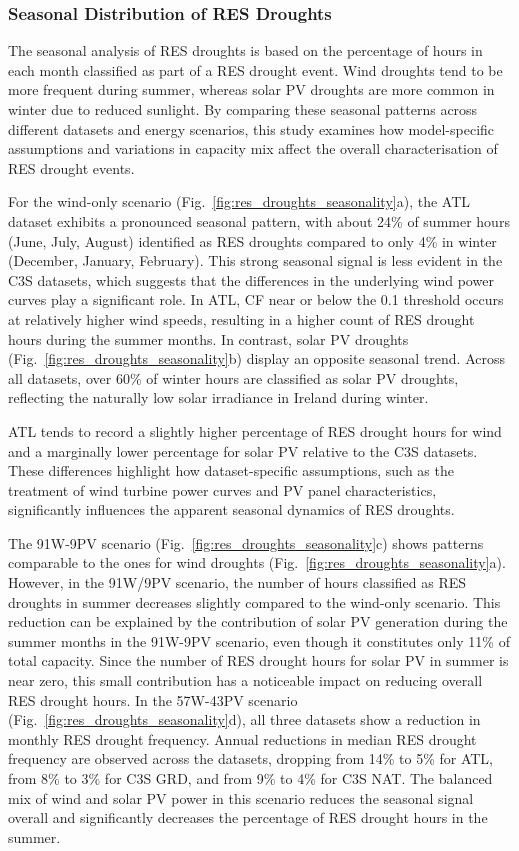 \documentclass[preprint, 12pt]{elsarticle}
\begin{document}
\subsubsection{Seasonal Distribution of RES Droughts}

The seasonal analysis of RES droughts is based on the percentage of hours in each month classified as part of a RES drought event. Wind droughts tend to be more frequent during summer, whereas solar PV droughts are more common in winter due to reduced sunlight. By comparing these seasonal patterns across different datasets and energy scenarios, this study examines how model-specific assumptions and variations in capacity mix affect the overall characterisation of RES drought events.

For the wind-only scenario (Fig.~\ref{fig:res_droughts_seasonality}a), the ATL dataset exhibits a pronounced seasonal pattern, with about 24\% of summer hours (June, July, August) identified as RES droughts compared to only 4\% in winter (December, January, February). This strong seasonal signal is less evident in the C3S datasets, which suggests that the differences in the underlying wind power curves play a significant role. In ATL, CF near or below the 0.1 threshold occurs at relatively higher wind speeds, resulting in a higher count of RES drought hours during the summer months. In contrast, solar PV droughts (Fig.~\ref{fig:res_droughts_seasonality}b) display an opposite seasonal trend. Across all datasets, over 60\% of winter hours are classified as solar PV droughts, reflecting the naturally low solar irradiance in Ireland during winter. 

ATL tends to record a slightly higher percentage of RES drought hours for wind and a marginally lower percentage for solar PV relative to the C3S datasets. These differences highlight how dataset-specific assumptions, such as the treatment of wind turbine power curves and PV panel characteristics, significantly influences the apparent seasonal dynamics of RES droughts.

The 91W-9PV scenario (Fig.~\ref{fig:res_droughts_seasonality}c) shows patterns comparable to the ones for wind droughts (Fig.~\ref{fig:res_droughts_seasonality}a). However, in the 91W/9PV scenario, the number of hours classified as RES droughts in summer decreases slightly compared to the wind-only scenario. This reduction can be explained by the contribution of solar PV generation during the summer months in the 91W-9PV scenario, even though it constitutes only 11\% of total capacity. Since the number of RES drought hours for solar PV in summer is near zero, this small contribution has a noticeable impact on reducing overall RES drought hours. In the 57W-43PV scenario (Fig.~\ref{fig:res_droughts_seasonality}d), all three datasets show a reduction in monthly RES drought frequency. Annual reductions in median RES drought frequency are observed across the datasets, dropping from 14\% to 5\% for ATL, from 8\% to 3\% for C3S GRD, and from 9\% to 4\% for C3S NAT. The balanced mix of wind and solar PV power in this scenario reduces the seasonal signal overall and significantly decreases the percentage of RES drought hours in the summer.
\end{document}
